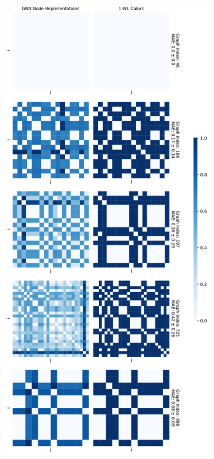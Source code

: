 \begin{figure}[!ht]
\begin{minipage}[b]{0.45992852703\textwidth}
    \end{minipage}
    \hfill
    \begin{minipage}[b]{0.53007147296\textwidth}
        \includegraphics[width=\textwidth, right]{Figures/heatmaps_IMDB-BINARY_1.pdf}

\end{minipage}
\end{figure}
